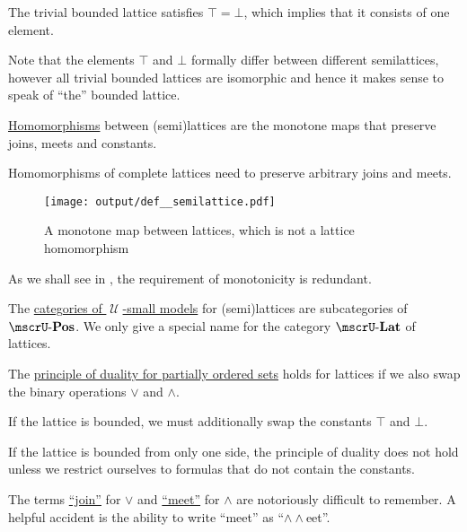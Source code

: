 \begin{definition}
\begin{thmenum}[resume=def:semilattice]
    The trivial bounded lattice satisfies \( \top = \bot \), which implies that it consists of one element.

    Note that the elements \( \top \) and \( \bot \) formally differ between different semilattices, however all trivial bounded lattices are isomorphic and hence it makes sense to speak of \enquote{the} bounded lattice.

     \hyperref[def:first_order_homomorphism]{Homomorphisms} between (semi)lattices are the monotone maps that preserve joins, meets and constants.

    Homomorphisms of complete lattices need to preserve arbitrary joins and meets.

    \begin{figure}[!ht]
      \centering
      \texttt{[image: output/def\_\_semilattice.pdf]}
      \caption{A monotone map between lattices, which is not a lattice homomorphism}
      \label{fig:def:semilattice/homomorphism/monotone_map_not_homomorphism}
    \end{figure}

    As we shall see in , the requirement of monotonicity is redundant.

     The \hyperref[def:category_of_small_first_order_models]{categories of \( \mscrU \)-small models} for (semi)lattices are subcategories of \hyperref[def:partially_ordered_set/category]{\( \ucat{Pos} \)}. We only give a special name for the category \( \ucat{Lat} \) of lattices.

     The \hyperref[def:partially_ordered_set/duality]{principle of duality for partially ordered sets} holds for lattices if we also swap the binary operations \( \vee \) and \( \wedge \).

    If the lattice is bounded, we must additionally swap the constants \( \top \) and \( \bot \).

    If the lattice is bounded from only one side, the principle of duality does not hold unless we restrict ourselves to formulas that do not contain the constants.
  \end{thmenum}
\end{definition}

\begin{remark}\label{rem:lattice_operation_etymology}
  The terms \hyperref[def:semilattice/join]{\enquote{join}} for \( \vee \) and \hyperref[def:semilattice/meet]{\enquote{meet}} for \( \wedge \) are notoriously difficult to remember. A helpful accident is the ability to write \enquote{meet} as \enquote{\( \wedge \wedge \)eet}.
\end{remark}

